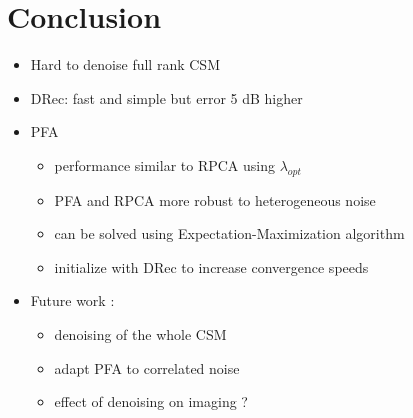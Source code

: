 \documentclass[10pt,xcolor=x11names,compress, notes=show]{beamer}%
\begin{document}
\section*{Conclusion}
\begin{frame}{\insertsectionhead}
	\begin{itemize}
		\item Hard to denoise full rank CSM
		\item DRec: fast and simple but error 5 dB higher
		\vfill
		\item PFA 
		\begin{itemize}
		        \item performance similar to RPCA using $\lambda_{opt}$
			\item PFA and RPCA more robust to heterogeneous noise	
			\item can be solved using Expectation-Maximization algorithm
			\item initialize with DRec  to increase convergence speeds
		\end{itemize}
		\vfill
		\item Future work : 
		\begin{itemize}
		        \item denoising of the whole CSM
		        \item adapt PFA to correlated noise
		        \item effect of denoising on imaging ?
		\end{itemize}
	\end{itemize}
\end{frame}
\end{document}
